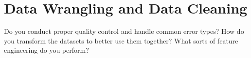 \section{Data Wrangling and Data Cleaning}
\label{subsec:dataCl}
Do you conduct proper quality control and handle
common error types? How do you transform the datasets to better use them together?
What sorts of feature engineering do you perform?